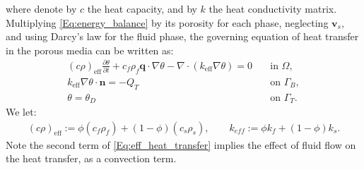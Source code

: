 where denote by $c$ the heat capacity, and by ${k}$ the heat conductivity matrix. 
Multiplying \eqref{Eq:energy_balance} by its porosity for each phase, neglecting $\mathbf{v}_{s}$, and using Darcy's law for the fluid phase, the governing equation of heat transfer in the porous media can be written as:
\begin{equation} \label{Eq:bulk_heat_transfer}
\begin{aligned}
\left(c\rho\right)_{\text{eff}} \frac{\partial \theta}{\partial t} +c_f\rho_f \mathbf{q}\cdot \nabla \theta -\nabla\cdot\left({k}_{\text{eff}}\nabla \theta\right) =0 \quad  &\text{in~} \Omega,\\
{k}_{\text{eff}}\nabla \theta\cdot\mathbf{n} =-Q_T \quad &\text{on~} \Gamma_B,\\
\theta = \theta_D \quad&\text{on~}\Gamma_T.
\end{aligned}
\end{equation}
We let:
\begin{equation} \label{Eq:eff_heat_transfer}
\begin{aligned}
(c\rho)_{\text{eff}}:=\phi(c_f\rho_f)+(1-\phi)(c_s\rho_s), \qquad
{k}_{eff}:=\phi {k}_f + (1-\phi){k}_s.
\end{aligned}
\end{equation}
Note the second term of \eqref{Eq:eff_heat_transfer} implies the effect of fluid flow on the heat transfer, as a convection term.
